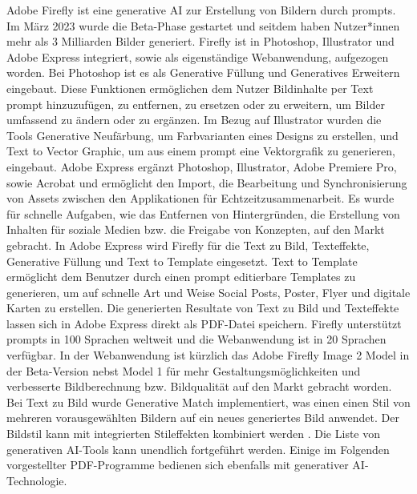 Adobe Firefly ist eine generative AI zur Erstellung von Bildern durch prompts. Im März 2023 wurde die Beta-Phase gestartet und seitdem haben Nutzer*innen mehr als 3 Milliarden Bilder generiert. Firefly ist in Photoshop, Illustrator und Adobe Express integriert, sowie als eigenständige Webanwendung, aufgezogen worden. Bei Photoshop ist es als Generative Füllung und Generatives Erweitern eingebaut. Diese Funktionen ermöglichen dem Nutzer Bildinhalte per Text prompt hinzuzufügen, zu entfernen, zu ersetzen oder zu erweitern, um Bilder umfassend zu ändern oder zu ergänzen. Im Bezug auf Illustrator wurden die Tools Generative Neufärbung, um Farbvarianten eines Designs zu erstellen, und Text to Vector Graphic, um aus einem prompt eine Vektorgrafik zu generieren, eingebaut. Adobe Express ergänzt Photoshop, Illustrator, Adobe Premiere Pro, sowie Acrobat und ermöglicht den Import, die Bearbeitung und Synchronisierung von Assets zwischen den Applikationen für Echtzeitzusammenarbeit. Es wurde für schnelle Aufgaben, wie das Entfernen von Hintergründen, die Erstellung von Inhalten für soziale Medien bzw. die Freigabe von Konzepten, auf den Markt gebracht. In Adobe Express wird Firefly für die Text zu Bild, Texteffekte, Generative Füllung und Text to Template eingesetzt. Text to Template ermöglicht dem Benutzer durch einen prompt editierbare Templates zu generieren, um auf schnelle Art und Weise Social Posts, Poster, Flyer und digitale Karten zu erstellen. Die generierten Resultate von Text zu Bild und Texteffekte lassen sich in Adobe Express direkt als PDF-Datei speichern. Firefly unterstützt prompts in 100 Sprachen weltweit und die Webanwendung ist in 20 Sprachen verfügbar. In der Webanwendung ist kürzlich das Adobe Firefly Image 2 Model in der Beta-Version nebst Model 1 für mehr Gestaltungsmöglichkeiten und verbesserte Bildberechnung bzw. Bildqualität auf den Markt gebracht worden. Bei Text zu Bild wurde Generative Match implementiert, was einen einen Stil von mehreren vorausgewählten Bildern auf ein neues generiertes Bild anwendet. Der Bildstil kann mit integrierten Stileffekten kombiniert werden \cite{adobe-firefly}. Die Liste von generativen AI-Tools kann unendlich fortgeführt werden. Einige im Folgenden vorgestellter PDF-Programme bedienen sich ebenfalls mit generativer AI-Technologie.     